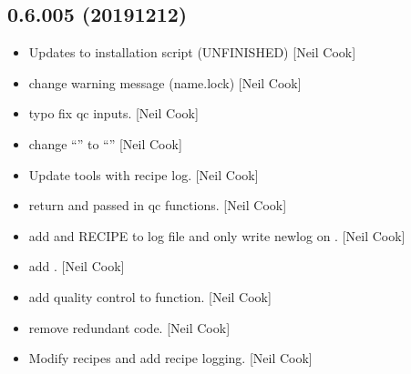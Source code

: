 \documentclass[a4paper,10pt,english]{report}
\begin{document}
\subsection{0.6.005 (2019\sphinxhyphen{}12\sphinxhyphen{}12)}
\label{\detokenize{misc/changelog:id32}}\begin{itemize}
\item {} 
Updates to installation script (UNFINISHED) {[}Neil Cook{]}

\item {} 
 \sphinxhyphen{} change warning message (name.lock) {[}Neil Cook{]}

\item {} 
 \sphinxhyphen{} typo fix qc inputs. {[}Neil Cook{]}

\item {} 
 \sphinxhyphen{} change “\sphinxhyphen{}” to “\textendash{}” {[}Neil Cook{]}

\item {} 
Update tools with recipe log. {[}Neil Cook{]}

\item {} 
 \sphinxhyphen{} return  and passed in qc
functions. {[}Neil Cook{]}

\item {} 
 \sphinxhyphen{} add  and RECIPE to log file and only write
newlog on . {[}Neil Cook{]}

\item {} 
 \sphinxhyphen{} add . {[}Neil Cook{]}

\item {} 
 \sphinxhyphen{} add quality control to function.
{[}Neil Cook{]}

\item {} 
 \sphinxhyphen{} remove redundant code. {[}Neil Cook{]}

\item {} 
Modify recipes and add recipe logging. {[}Neil Cook{]}

\end{itemize}
\end{document}
